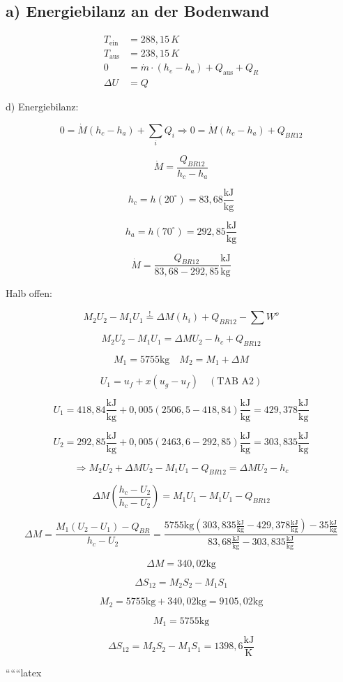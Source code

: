 \subsection*{a) Energiebilanz an der Bodenwand}

\begin{align*}
T_{\text{ein}} &= 288,15\,K \\
T_{\text{aus}} &= 238,15\,K \\
0 &= \dot{m} \cdot (h_e - h_a) + Q_{\text{aus}} + Q_R \\
\Delta U &= Q
\end{align*}

d) Energiebilanz:

\[
0 = \dot{M} (h_c - h_a) + \sum_i Q_{i} \Rightarrow 0 = \dot{M} (h_c - h_a) + Q_{BR12}
\]

\[
\dot{M} = \frac{Q_{BR12}}{h_c - h_a}
\]

\[
h_c = h \left( 20^\circ \right) = 83,68 \frac{\text{kJ}}{\text{kg}}
\]

\[
h_a = h \left( 70^\circ \right) = 292,85 \frac{\text{kJ}}{\text{kg}}
\]

\[
\dot{M} = \frac{Q_{BR12}}{83,68 - 292,85} \frac{\text{kJ}}{\text{kg}}
\]

Halb offen:

\[
M_2 U_2 - M_1 U_1 \stackrel{!}{=} \Delta M (h_i) + Q_{BR12} - \sum W^o
\]

\[
M_2 U_2 - M_1 U_1 = \Delta M U_2 - h_c + Q_{BR12}
\]

\[
M_1 = 5755 \text{kg} \quad M_2 = M_1 + \Delta M
\]

\[
U_1 = u_f + x (u_g - u_f) \quad (\text{TAB A2})
\]

\[
U_1 = 418,84 \frac{\text{kJ}}{\text{kg}} + 0,005 (2506,5 - 418,84) \frac{\text{kJ}}{\text{kg}} = 429,378 \frac{\text{kJ}}{\text{kg}}
\]

\[
U_2 = 292,85 \frac{\text{kJ}}{\text{kg}} + 0,005 (2463,6 - 292,85) \frac{\text{kJ}}{\text{kg}} = 303,835 \frac{\text{kJ}}{\text{kg}}
\]

\[
\Rightarrow M_2 U_2 + \Delta M U_2 - M_1 U_1 - Q_{BR12} = \Delta M U_2 - h_c
\]

\[
\Delta M \left( \frac{h_c - U_2}{h_c - U_2} \right) = M_1 U_1 - M_1 U_1 - Q_{BR12}
\]

\[
\Delta M = \frac{M_1 (U_2 - U_1) - Q_{BR}}{h_c - U_2} = \frac{5755 \text{kg} (303,835 \frac{\text{kJ}}{\text{kg}} - 429,378 \frac{\text{kJ}}{\text{kg}}) - 35 \frac{\text{kJ}}{\text{kg}}}{83,68 \frac{\text{kJ}}{\text{kg}} - 303,835 \frac{\text{kJ}}{\text{kg}}}
\]

\[
\Delta M = 340,02 \text{kg}
\]

\[
\Delta S_{12} = M_2 S_2 - M_1 S_1
\]

\[
M_2 = 5755 \text{kg} + 340,02 \text{kg} = 9105,02 \text{kg}
\]

\[
M_1 = 5755 \text{kg}
\]

\[
\Delta S_{12} = M_2 S_2 - M_1 S_1 = 1398,6 \frac{\text{kJ}}{\text{K}}
\]

``````latex